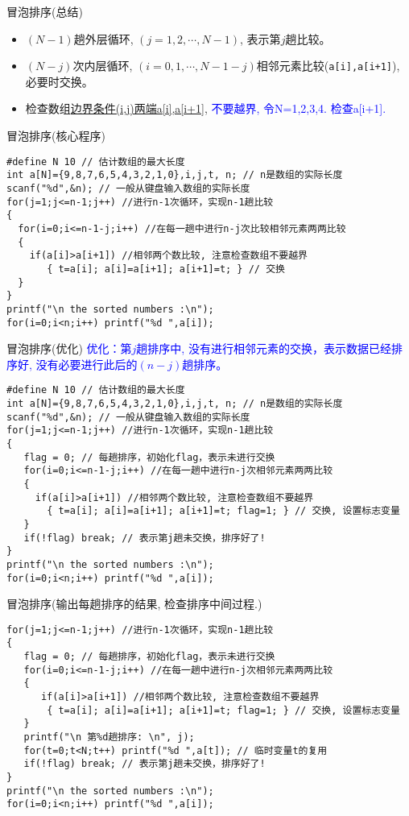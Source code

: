 \begin{frame}{冒泡排序(总结)}
\vspace{-0.4cm}
\begin{itemize}
	\item $(N-1)$趟外层循环, $(j=1,2,\cdots,N-1)$, 表示第$j$趟比较。
	\item $(N-j)$次内层循环, $(i=0,1,\cdots, N-1-j)$相邻元素比较(\lstinline|a[i],a[i+1]|), 必要时交换。
	\item 检查数组\underline{边界条件(i,j)两端a[i],a[i+1]}, \textcolor{blue}{不要越界, 令N=1,2,3,4. 检查a[i+1].}
\end{itemize}
\end{frame}

\begin{frame}{冒泡排序(核心程序)}
\begin{lstlisting}
#define N 10 // 估计数组的最大长度
int a[N]={9,8,7,6,5,4,3,2,1,0},i,j,t, n; // n是数组的实际长度
scanf("%d",&n); // 一般从键盘输入数组的实际长度
for(j=1;j<=n-1;j++) //进行n-1次循环，实现n-1趟比较
{
  for(i=0;i<=n-1-j;i++) //在每一趟中进行n-j次比较相邻元素两两比较
  {
    if(a[i]>a[i+1]) //相邻两个数比较, 注意检查数组不要越界 
       { t=a[i]; a[i]=a[i+1]; a[i+1]=t; } // 交换
  }
}
printf("\n the sorted numbers :\n");
for(i=0;i<n;i++) printf("%d ",a[i]);
\end{lstlisting}
\end{frame}

\begin{frame}{冒泡排序(优化)}
\textcolor{blue}{优化：第$j$趟排序中, 没有进行相邻元素的交换，表示数据已经排序好, 没有必要进行此后的$(n-j)$趟排序。}
\begin{lstlisting}
#define N 10 // 估计数组的最大长度
int a[N]={9,8,7,6,5,4,3,2,1,0},i,j,t, n; // n是数组的实际长度
scanf("%d",&n); // 一般从键盘输入数组的实际长度
for(j=1;j<=n-1;j++) //进行n-1次循环，实现n-1趟比较
{
   flag = 0; // 每趟排序，初始化flag，表示未进行交换
   for(i=0;i<=n-1-j;i++) //在每一趟中进行n-j次相邻元素两两比较
   {
     if(a[i]>a[i+1]) //相邻两个数比较, 注意检查数组不要越界 
       { t=a[i]; a[i]=a[i+1]; a[i+1]=t; flag=1; } // 交换, 设置标志变量
   }
   if(!flag) break; // 表示第j趟未交换，排序好了!
}
printf("\n the sorted numbers :\n");
for(i=0;i<n;i++) printf("%d ",a[i]);
\end{lstlisting}
\end{frame}

\begin{frame}{冒泡排序(输出每趟排序的结果, 检查排序中间过程.)}
\begin{lstlisting}
for(j=1;j<=n-1;j++) //进行n-1次循环，实现n-1趟比较
{
   flag = 0; // 每趟排序，初始化flag，表示未进行交换
   for(i=0;i<=n-1-j;i++) //在每一趟中进行n-j次相邻元素两两比较
   {
      if(a[i]>a[i+1]) //相邻两个数比较, 注意检查数组不要越界 
       { t=a[i]; a[i]=a[i+1]; a[i+1]=t; flag=1; } // 交换, 设置标志变量
   }
   printf("\n 第%d趟排序: \n", j);
   for(t=0;t<N;t++) printf("%d ",a[t]); // 临时变量t的复用
   if(!flag) break; // 表示第j趟未交换，排序好了!
}
printf("\n the sorted numbers :\n");
for(i=0;i<n;i++) printf("%d ",a[i]);
\end{lstlisting}
\end{frame}